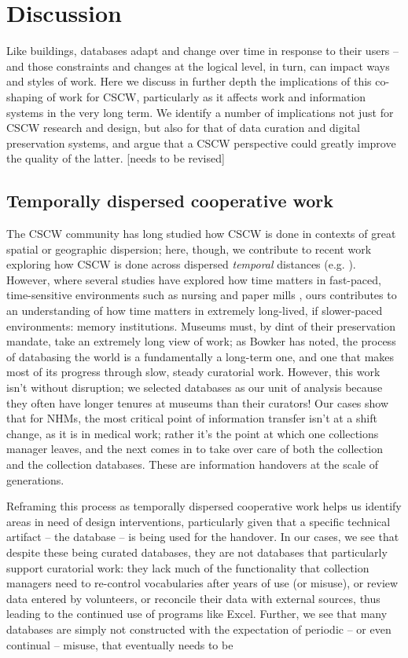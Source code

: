 \section{Discussion}

Like buildings, databases adapt and change over time in response to their users -- and those constraints and changes at the logical level, in turn, can impact ways and styles of work.  Here we discuss in further depth the implications of this co-shaping of work for CSCW, particularly as it affects work and information systems in the very long term. We identify a number of implications not just for CSCW research and design, but also for that of data curation and digital preservation systems, and argue that a CSCW perspective could greatly improve the quality of the latter. [needs to be revised]

\subsection{Temporally dispersed cooperative work}

The CSCW community has long studied how CSCW is done in contexts of great spatial or geographic dispersion; here, though, we contribute to recent work exploring how CSCW is done across dispersed \textit{temporal} distances (e.g. \cite{Jackson_2011, Lindley_2015}). However, where several studies have explored how time matters in fast-paced, time-sensitive environments such as nursing \cite{sarcevic2009information, Reddy_2006}  and paper mills \cite{auramaki1996paperwork}, ours contributes to an understanding of how time matters in extremely long-lived, if slower-paced environments: memory institutions. Museums must, by dint of their preservation mandate, take an extremely long view of work; as Bowker has noted, the process of databasing the world is a fundamentally a long-term one, and one that makes most of its progress through slow, steady curatorial work. However, this work isn't without disruption; we selected databases as our unit of analysis because they often have longer tenures at museums than their curators! Our cases show that for NHMs, the most critical point of information transfer isn't at a shift change, as it is in medical work; rather it's the point at which one collections manager leaves, and the next comes in to take over care of both the collection and the collection databases. These are information handovers at the scale of generations.

Reframing this process as temporally dispersed cooperative work helps us identify areas in need of design interventions, particularly given that a specific technical artifact -- the database -- is being used for the handover. In our cases, we see that despite these being curated databases, they are not databases that particularly support curatorial work: they lack much of the functionality that collection managers need to re-control vocabularies after years of use (or misuse), or review data entered by volunteers, or reconcile their data with external sources, thus leading to the continued use of programs like Excel. Further, we see that many databases are simply not constructed with the expectation of periodic -- or even continual -- misuse, that eventually needs to be 

